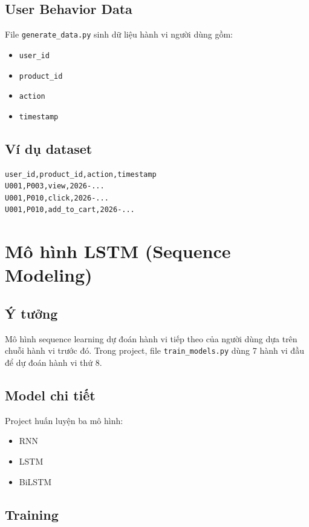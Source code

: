 \documentclass[12pt,a4paper]{report}
\begin{document}
\subsection{User Behavior Data}

File \texttt{generate\_data.py} sinh dữ liệu hành vi người dùng gồm:

\begin{itemize}
  \item \texttt{user\_id}
  \item \texttt{product\_id}
  \item \texttt{action}
  \item \texttt{timestamp}
\end{itemize}

\subsection{Ví dụ dataset}

\begin{verbatim}
user_id,product_id,action,timestamp
U001,P003,view,2026-...
U001,P010,click,2026-...
U001,P010,add_to_cart,2026-...
\end{verbatim}

\section{Mô hình LSTM (Sequence Modeling)}

\subsection{Ý tưởng}

Mô hình sequence learning dự đoán hành vi tiếp theo của người dùng dựa trên chuỗi hành vi trước đó. Trong project, file \texttt{train\_models.py} dùng 7 hành vi đầu để dự đoán hành vi thứ 8.

\subsection{Model chi tiết}

Project huấn luyện ba mô hình:

\begin{itemize}
  \item RNN
  \item LSTM
  \item BiLSTM
\end{itemize}

\subsection{Training}
\end{document}

